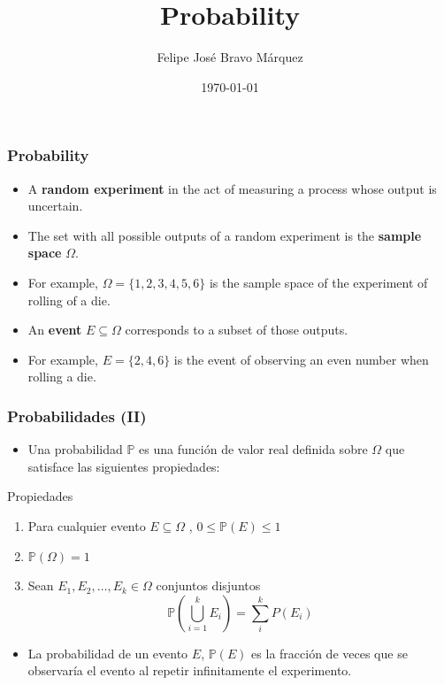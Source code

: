 \documentclass[handout]{beamer}
\title{Probability}
\author[Felipe Bravo Márquez]{\footnotesize
 \textcolor[rgb]{0.00,0.00,1.00}{Felipe José Bravo Márquez}}
\date{ \today }
\begin{document}
\begin{frame}
\titlepage


\end{frame}





\begin{frame}\frametitle{Probability}
\scriptsize{

\begin{itemize}
 \item A \textbf{random experiment} in the act of measuring a process whose output is uncertain.
 \item The set with all possible outputs of a random experiment is the \textbf{sample space} $\Omega$.
 \item For example, $\Omega = \{ 1,2,3,4,5,6 \}$ is the sample space of the experiment of rolling of a die.
 \item An \textbf{event} $E \subseteq \Omega$ corresponds to a subset of those outputs.
 \item For example, $E = \{ 2,4,6 \}$ is the event of observing an even number when rolling a die.
\end{itemize}

}

\end{frame}

\begin{frame}\frametitle{Probabilidades (II)}
\begin{scriptsize}
\begin{itemize}
 \item Una probabilidad $\mathbb{P}$ es una función de valor real definida sobre $\Omega$ que satisface las siguientes propiedades:
\end{itemize}

\begin{block}{Propiedades}
\begin{enumerate}
 \item Para cualquier evento $E \subseteq \Omega$ , $0 \leq \mathbb{P}(E) \leq 1$
 \item $\mathbb{P}(\Omega)=1$
 \item Sean $E_{1},E_{2},\dots,E_{k} \in \Omega$ conjuntos disjuntos 
 \begin{displaymath}
  \mathbb{P}(\bigcup_{i=1}^{k}E_{i}) = \sum_{i}^{k}P(E_{i})
 \end{displaymath}
\end{enumerate}
\end{block}
\begin{itemize}
 \item La probabilidad de un evento $E$, $\mathbb{P}(E)$ es la fracción de veces que se observaría el evento al repetir infinitamente el experimento.
\end{itemize}


\end{scriptsize} 

\end{frame}
\end{document}

